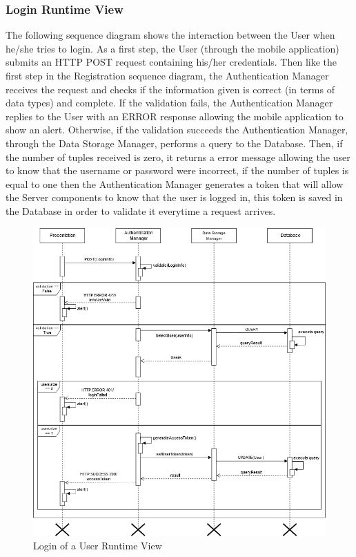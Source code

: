 \subsubsection{Login Runtime View}
The following sequence diagram shows the interaction between the User when he/she tries to login.\newline
As a first step, the User (through the mobile application) submits an HTTP POST request containing his/her credentials. Then like the first step in the Registration sequence diagram, the Authentication Manager receives the request and checks if the information given is correct (in terms of data types) and complete.\newline
If the validation fails, the Authentication Manager replies to the User with an ERROR response allowing the mobile application to show an alert.\newline
Otherwise, if the validation succeeds the Authentication Manager, through the Data Storage Manager, performs a query to the Database. Then, if the number of tuples received is zero, it returns a error message allowing the user to know that the username or password were incorrect, if the number of tuples is equal to one then the Authentication Manager generates a token that will allow the Server components to know that the user is logged in, this token is saved in the Database in order to validate it everytime a request arrives. 

\begin{figure}[H]
          \includegraphics[scale=0.5]{Images/seq_log_9.png}
        \caption{Login of a User Runtime View}
\end{figure}

